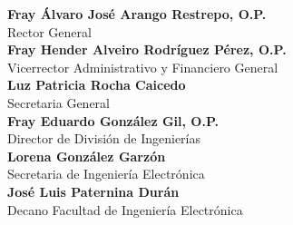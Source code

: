 
\begin{flushright}
\textbf{Fray Álvaro José Arango Restrepo, O.P.}\\ Rector General\\[0.7cm]
\textbf{Fray Hender Alveiro Rodríguez Pérez, O.P.}\\ Vicerrector Administrativo y Financiero General\\[0.7cm]
\textbf{Luz Patricia Rocha Caicedo}\\ Secretaria General\\[0.7cm]
\textbf{Fray Eduardo González Gil, O.P.}\\ Director de División de Ingenierías\\[0.7cm]
\textbf{Lorena González Garzón}\\ Secretaria de Ingeniería Electrónica\\[0.7cm]
\textbf{José Luis Paternina Durán}\\ Decano Facultad de Ingeniería Electrónica
\end{flushright}
